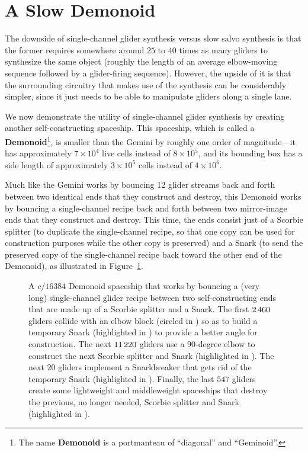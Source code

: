 \section{A Slow Demonoid}\label{sec:slow_demonoid}

The downside of single-channel glider synthesis versus slow salvo synthesis is that the former requires somewhere around $25$ to $40$ times as many gliders to synthesize the same object (roughly the length of an average elbow-moving sequence followed by a glider-firing sequence). However, the upside of it is that the surrounding circuitry that makes use of the synthesis can be considerably simpler, since it just needs to be able to manipulate gliders along a single lane.

We now demonstrate the utility of single-channel glider synthesis by creating another self-constructing spaceship. This spaceship, which is called a \textbf{Demonoid}\footnote{The name \textbf{Demonoid} is a portmanteau of ``diagonal'' and ``Geminoid''.}, is smaller than the Gemini by roughly one order of magnitude---it has approximately $7 \times 10^4$ live cells instead of $8 \times 10^5$, and its bounding box has a side length of approximately $3 \times 10^5$ cells instead of $4 \times 10^6$.

Much like the Gemini works by bouncing 12 glider streams back and forth between two identical ends that they construct and destroy, this Demonoid works by bouncing a single-channel recipe back and forth between two mirror-image ends that they construct and destroy. This time, the ends consist just of a Scorbie splitter (to duplicate the single-channel recipe, so that one copy can be used for construction purposes while the other copy is preserved) and a Snark (to send the preserved copy of the single-channel recipe back toward the other end of the Demonoid), as illustrated in Figure~\ref{fig:slow_demonoid}.

\begin{figure}[!htbp]
	\centering
	\caption{A $c/16384$ Demonoid spaceship that works by bouncing a (very long) single-channel glider recipe between two self-constructing ends that are made up of a Scorbie splitter and a Snark. The first $2{\,}460$ gliders collide with an elbow block (circled in ) so as to build a temporary Snark (highlighted in ) to provide a better angle for construction. The next $11{\,}220$ gliders use a $90$-degree elbow to construct the next Scorbie splitter and Snark (highlighted in ). The next $20$ gliders implement a Snarkbreaker that gets rid of the temporary Snark (highlighted in ). Finally, the last $547$ gliders create some lightweight and middleweight spaceships that destroy the previous, no longer needed, Scorbie splitter and Snark (highlighted in ).}\label{fig:slow_demonoid}
\end{figure}

